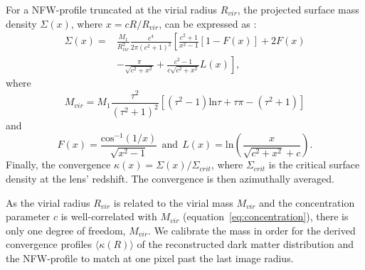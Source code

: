 \documentclass[useAMS,usenatbib]{mn2e}
\begin{document}
For a NFW-profile truncated at the virial radius $R_{vir}$, the projected surface mass density $\Sigma(x)$, where $x = cR/R_{vir}$, can be expressed as \citep{2009JCAP...01..015B}:
\begin{equation}
 \begin{aligned}
  \Sigma(x) = & \frac{M_1}{R_{vir}^2}\frac{c^4}{2\pi(c^2+1)^2}\left[\frac{c^2+1}{x^2-1}[1-F(x)]+2F(x) \right. \\
  & \left. -\frac{\pi}{\sqrt{c^2+x^2}}+\frac{c^2-1}{c\sqrt{c^2+x^2}}L(x)\right],
 \end{aligned}
\end{equation}
where
\begin{equation}
  M_{vir} = M_{1} \frac{\tau^2}{(\tau^2+1)^2}\left[(\tau^2-1)\mathrm{ln}\tau+\tau\pi-(\tau^2+1)\right]
\end{equation}
and
\begin{equation}
  F(x) = \frac{\mathrm{cos}^{-1}(1/x)}{\sqrt{x^2-1}} \ \ \mathrm{and} \ \ L(x) = \mathrm{ln}\left(\frac{x}{\sqrt{c^2+x^2}+c}\right).
\end{equation}
Finally, the convergence $\kappa(x)=\Sigma(x)/\Sigma_{crit}$, where $\Sigma_{crit}$ is the critical surface density at the lens' redshift. The convergence is then azimuthally averaged.

As the virial radius $R_{vir}$ is related to the virial mass $M_{vir}$ and the concentration parameter $c$ is well-correlated with $M_{vir}$ (equation~\ref{eq:concentration}), there is only one degree of freedom, $M_{vir}$. We calibrate the mass in order for the derived convergence profiles $\langle\kappa(R)\rangle$ of the reconstructed dark matter distribution and the NFW-profile to match at one pixel past the last image radius.
\end{document}
